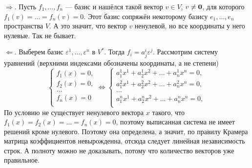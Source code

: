 \begin{solution}
    $\Rightarrow$. Пусть $f_1, \ldots, f_n$ --- базис и нашёлся такой вектор $v \in V$, $v \ne \boldsymbol{0}$, для которого $f_1(v) = \ldots = f_n(v) = 0$. Этот базис сопряжён некоторому базису $e_1, \ldots, e_n$ пространства $V$. А это значит, что вектор $v$ ненулевой, но все координаты у него нулевые. Так не бывает.

    $\Leftarrow$. Выберем базис $\varepsilon^1, \ldots, \varepsilon^n$ в $V^\ast$. Тогда $f_i = a^i_j\varepsilon^j$. Рассмотрим систему уравнений (верхними индексами обозначены координаты, а не степени)
    \[
        \begin{cases}
            f_1(x) = 0,\\
            f_2(x) = 0,\\
            \ldots\\
            f_n(x) = 0\\
        \end{cases} \Leftrightarrow
        \begin{cases}
            a^1_1x^1 + a^1_2x^2 + \ldots + a^1_nx^n = 0,\\
            a^2_1x^1 + a^2_2x^2 + \ldots + a^2_nx^n = 0,\\
            \ldots\\
            a^n_1x^1 + a^n_2x^2 + \ldots + a^n_nx^n = 0,\\
        \end{cases}
    \]
    По условию не существует ненулевого вектора $x$ такого, что $f_1(x) = f_2(x) = \ldots = f_n(x) = 0$, поэтому выписанная система не имеет решений кроме нулевого. Поэтому она определена, а значит, по правилу Крамера матрица коэффициентов невырожденна, отсюда следует линейная независимость строк. А полноту можно не доказывать, потому что количество векторов уже правильное.
\end{solution}

